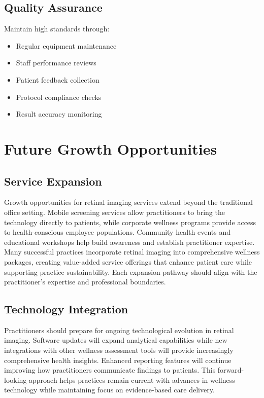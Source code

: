\documentclass[
  Letterpaper,
]{scrbook}
\providecommand{\tightlist}{%
  \setlength{\itemsep}{0pt}\setlength{\parskip}{0pt}}\usepackage{longtable,booktabs,array}
\begin{document}
\subsection{Quality Assurance}\label{quality-assurance}

Maintain high standards through:

\begin{itemize}
\tightlist
\item
  Regular equipment maintenance
\item
  Staff performance reviews
\item
  Patient feedback collection
\item
  Protocol compliance checks
\item
  Result accuracy monitoring
\end{itemize}

\section{Future Growth Opportunities}\label{future-growth-opportunities}

\subsection{Service Expansion}\label{service-expansion}

Growth opportunities for retinal imaging services extend beyond the
traditional office setting. Mobile screening services allow
practitioners to bring the technology directly to patients, while
corporate wellness programs provide access to health-conscious employee
populations. Community health events and educational workshops help
build awareness and establish practitioner expertise. Many successful
practices incorporate retinal imaging into comprehensive wellness
packages, creating value-added service offerings that enhance patient
care while supporting practice sustainability. Each expansion pathway
should align with the practitioner's expertise and professional
boundaries.

\subsection{Technology Integration}\label{technology-integration}

Practitioners should prepare for ongoing technological evolution in
retinal imaging. Software updates will expand analytical capabilities
while new integrations with other wellness assessment tools will provide
increasingly comprehensive health insights. Enhanced reporting features
will continue improving how practitioners communicate findings to
patients. This forward-looking approach helps practices remain current
with advances in wellness technology while maintaining focus on
evidence-based care delivery.
\end{document}
